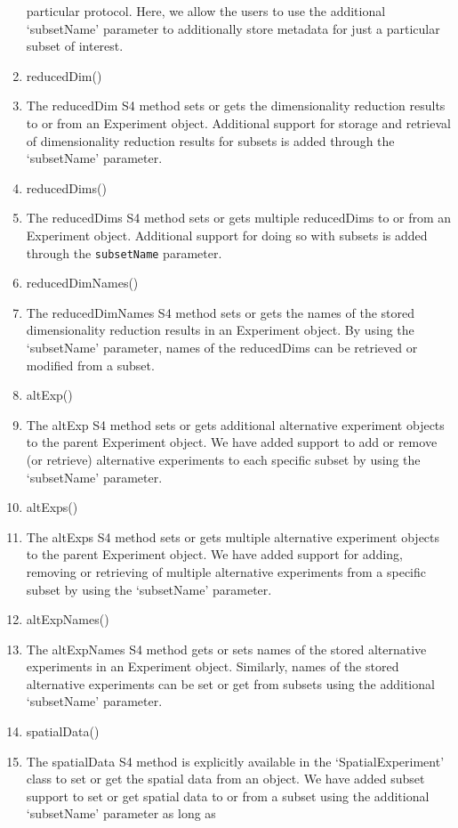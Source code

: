 \documentclass[
]{article}
\begin{document}
\begin{enumerate}
  particular protocol. Here, we allow the users to use the additional
  `subsetName' parameter to additionally store metadata for just a
  particular subset of interest.
\item
  reducedDim()
\item
  The reducedDim S4 method sets or gets the dimensionality reduction
  results to or from an Experiment object. Additional support for
  storage and retrieval of dimensionality reduction results for subsets
  is added through the `subsetName' parameter.
\item
  reducedDims()
\item
  The reducedDims S4 method sets or gets multiple reducedDims to or from
  an Experiment object. Additional support for doing so with subsets is
  added through the \texttt{subsetName} parameter.
\item
  reducedDimNames()
\item
  The reducedDimNames S4 method sets or gets the names of the stored
  dimensionality reduction results in an Experiment object. By using the
  `subsetName' parameter, names of the reducedDims can be retrieved or
  modified from a subset.
\item
  altExp()
\item
  The altExp S4 method sets or gets additional alternative experiment
  objects to the parent Experiment object. We have added support to add
  or remove (or retrieve) alternative experiments to each specific
  subset by using the `subsetName' parameter.
\item
  altExps()
\item
  The altExps S4 method sets or gets multiple alternative experiment
  objects to the parent Experiment object. We have added support for
  adding, removing or retrieving of multiple alternative experiments
  from a specific subset by using the `subsetName' parameter.
\item
  altExpNames()
\item
  The altExpNames S4 method gets or sets names of the stored alternative
  experiments in an Experiment object. Similarly, names of the stored
  alternative experiments can be set or get from subsets using the
  additional `subsetName' parameter.
\item
  spatialData()
\item
  The spatialData S4 method is explicitly available in the
  `SpatialExperiment' class to set or get the spatial data from an
  object. We have added subset support to set or get spatial data to or
  from a subset using the additional `subsetName' parameter as long as

\end{enumerate}
\end{document}
